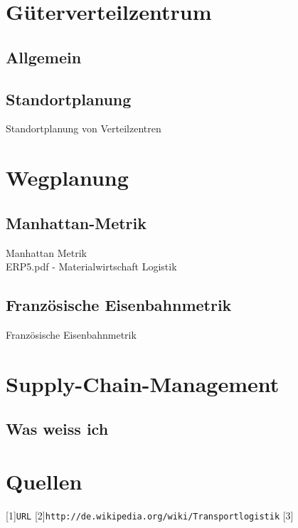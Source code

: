 \documentclass[a4paper,12pt]{scrreprt}
\begin{document}
	\chapter{Güterverteilzentrum}
	\section{Allgemein}
	
	\section{Standortplanung}
	Standortplanung von Verteilzentren
	
	\chapter{Wegplanung}
	\section{Manhattan-Metrik}
	Manhattan Metrik\\
	ERP5.pdf - Materialwirtschaft Logistik
	\section{Französische Eisenbahnmetrik}
		Französische Eisenbahnmetrik

	\chapter{Supply-Chain-Management}
	\section{Was weiss ich}
	
\chapter{Quellen}
[1]\nolinkurl{URL} 
[2]\nolinkurl{http://de.wikipedia.org/wiki/Transportlogistik}
[3]\nolinkurl{}
\end{document}
